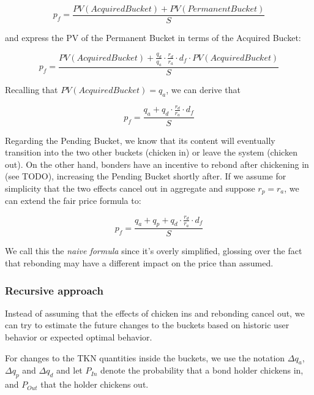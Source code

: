 \documentclass{article}
\begin{document}
\begin{equation}
  \label{eq:naive-1}
    p_f = \frac{PV(AcquiredBucket) + PV(PermanentBucket)}{S}
\end{equation}

and express the PV of the Permanent Bucket in terms of the Acquired Bucket:

\begin{equation}
  \label{eq:naive-2}
   p_f = \frac{PV(AcquiredBucket) + \frac{q_d}{q_a} \cdot \frac{r_d}{r_a} \cdot d_f \cdot PV(AcquiredBucket)}{S}
\end{equation}

Recalling that $PV(AcquiredBucket) = q_a$, we can derive that

\begin{equation}
  \label{eq:naive-3}
   p_f = \frac{q_a + q_d \cdot \frac{r_d}{r_a} \cdot d_f}{S}
\end{equation}

Regarding the Pending Bucket, we know that its content will eventually transition into the two other buckets (chicken in) or leave the system (chicken out). On the other hand, bonders have an incentive to rebond after chickening in (see TODO), increasing the Pending Bucket shortly after. If we assume for simplicity that the two effects cancel out in aggregate and suppose $r_p = r_a$, we can extend the fair price formula to:

\begin{equation}
  \label{eq:naive-4}
   p_f = \frac{q_a + q_p + q_d \cdot \frac{r_d}{r_a} \cdot d_f}{S}
\end{equation}

We call this the \textit{naive formula} since it's overly simplified, glossing over the fact that rebonding may have a different impact on the price than assumed. 

\subsubsection{Recursive approach}
Instead of assuming that the effects of chicken ins and rebonding cancel out, we can try to estimate the future changes to the buckets based on historic user behavior or expected optimal behavior.

For changes to the TKN quantities inside the buckets, we use the notation $\Delta q_{a}$, $\Delta q_{p}$ and $\Delta q_{d}$ and let $P_{In}$ denote the probability that a bond holder chickens in, and $P_{Out}$ that the holder chickens out.
\end{document}
